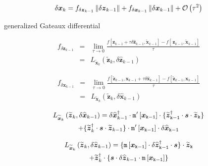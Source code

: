 \documentclass[letterpaper,twocolumn,amsmath,amsfont,amssymb,english,aps,jcp,preprintnumbers,groupaddress,nofootinbib,tightenlines]{revtex4}
\newcommand{\mat}[1]{\boldsymbol{#1}}
\begin{document}
\begin{equation}
\delta \mat{x}_k = {f}_{\delta \mat{z}_{k-1}}  \, \lVert \delta \mat{z}_{k-1} \rVert 
                              +  {f}_{\delta \mat{x}_{k-1}}   \, \lVert \delta \mat{x}_{k-1} \rVert 
                                                                                      + {\cal{O}} \left(  \tau^2 \right)
\end{equation}

generalized Gateaux differential

\begin{eqnarray}
f_{\delta \mat{z}_{k-1}} &=& \lim_{\tau \rightarrow 0} \frac{ f [ \mat{z}_{k-1} +\tau  \delta \widehat{\mat{z}}_{k-1}, \widetilde{\mat{x}}_{k-1} ]
-f [\, \mat{z}_{k-1}, \widetilde{\mat{x}}_{k-1} ]  }{\tau} \nonumber  \\[0.1cm] 
&=&{L}_{\widetilde{\mat{x}}_k}\left(\widetilde{\mat{z}}_{k} , \delta \widehat{\mat{z}}_{k-1} \right)  
\end{eqnarray}

\begin{eqnarray}
f_{\delta \mat{x}_{k-1}} &=& \lim_{\tau \rightarrow 0} \frac{ f [ \widetilde{\mat{z}}_{k-1}, \mat{x}_{k-1} + \tau \delta \widehat{\mat{x}}_{k-1} ]
-f [ \widetilde{\mat{z}}_{k-1}, \mat{x}_{k-1} ]  }{\tau} \nonumber  \\[0.1cm] 
&=&{L}_{\widetilde{\mat{x}}_k}\left(\widetilde{\mat{z}}_{k} , \delta \widehat{\mat{x}}_{k-1} \right)  
\end{eqnarray}

\begin{multline}
{L}_{\widetilde{\mat{x}}_k}\left(\widetilde{\mat{z}}_{k} , \delta \widehat{\mat{x}}_{k-1} \right) 
= \delta \widehat{\mat{x}}^\dagger_{k-1} \cdot   \tt{m}'\left[\mat{x}_{k-1} \right] \cdot 
\{\widetilde{\mat{z}}^\dagger_{k-1}  \cdot \mat{s} \cdot \widetilde{\mat{z}}_{k} \}  \\
+ \{ \widetilde{\mat{z}}^\dagger_{k} \cdot \mat{s} \cdot  \widetilde{\mat{z}}_{k-1} \} 
\cdot \tt{m}'\left[\mat{x}_{k-1} \right]  \cdot \delta \widehat{\mat{x}}_{k-1} 
\end{multline}

\begin{multline}
{L}_{\widetilde{\mat{x}}_k}\left(\widetilde{\mat{z}}_{k} , \delta \widehat{\mat{z}}_{k-1} \right) = 
\{ \tt{m}\left[\mat{x}_{k-1} \right]  \cdot \delta {\widehat{\mat{z}}}^\dagger_{k-1} 
 \cdot \mat{s} \} \cdot \widetilde{\mat{z}}_{k} \\
+\widetilde{\mat{z}}^\dagger_{k} \cdot \{ \mat{s} \cdot \delta {\widehat{\mat{z}}}_{k-1}
\cdot \tt{m}\left[\mat{x}_{k-1} \right]    \} 
\end{multline}
\end{document}
